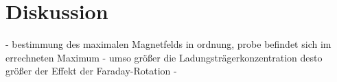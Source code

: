 \section{Diskussion}
\label{sec:Diskussion}
 - bestimmung des maximalen Magnetfelds in ordnung, probe befindet sich im errechneten Maximum
 - umso größer die Ladungsträgerkonzentration desto größer der Effekt der Faraday-Rotation
 - 